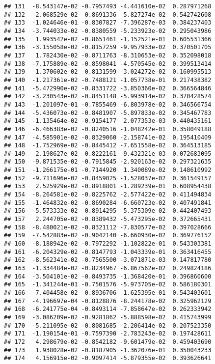 \documentclass[
]{article}
\begin{document}
\begin{verbatim}
## 131  -8.543147e-02 -0.7957493 -4.441610e-02  0.287971268
## 132  -2.068529e-02 -0.8691336 -5.827274e-02  0.542742608
## 133  -1.024646e-01 -0.8307827 -7.396287e-03  0.384237403
## 134  -3.744033e-02 -0.8380559 -5.233923e-02  0.295043986
## 135   1.993542e-02 -0.8651461 -1.152521e-01  0.605531366
## 136  -3.155058e-02 -0.8157259 -9.957933e-02  0.370501705
## 137   1.782430e-02 -0.8711763 -8.310653e-02  0.352098018
## 138  -7.175889e-02 -0.8598041 -4.570545e-02  0.399513414
## 139  -1.370602e-02 -0.8131599 -3.024272e-02  0.160995513
## 140  -1.217361e-02 -0.7488121 -1.057738e-01  0.217438382
## 141  -5.472990e-02 -0.8331722 -3.850360e-02  0.366564846
## 142  -3.230543e-02 -0.8451148 -5.993914e-02  0.370428574
## 143  -1.201097e-01 -0.7855469 -6.803978e-02  0.346566754
## 144  -5.436073e-02 -0.8481907 -5.897833e-02  0.345467783
## 145  -1.135464e-02 -0.9154177  2.077353e-03  0.440435161
## 146  -6.466383e-02 -0.8240516 -1.048242e-01  0.358049188
## 147  -4.585901e-02 -0.8329060 -2.158741e-02  0.195410409
## 148  -1.752969e-02 -0.8445412 -7.651558e-02  0.364513185
## 149  -2.198627e-02 -0.8222161 -9.432321e-03  0.072683095
## 150  -9.871535e-02 -0.7915845 -2.920163e-02  0.297321635
## 151  -1.266175e-01 -0.7144920  1.340089e-02  0.148610992
## 152  -9.711696e-02 -0.8459025 -1.528037e-02  0.361549157
## 153   2.525929e-02 -0.8918801 -1.289239e-01  0.608954438
## 154  -8.264581e-02 -0.8225762 -2.577422e-02  0.411494834
## 155  -1.464832e-02 -0.8690284 -6.660723e-02  0.407491841
## 156  -5.573333e-02 -0.8914295 -5.375309e-02  0.442407493
## 157   2.244705e-02 -0.8389432 -5.473295e-02  0.372665431
## 158  -8.480021e-02 -0.8321112 -7.830577e-02  0.397028666
## 159  -7.542883e-02 -0.9042140 -6.660930e-02  0.369776152
## 160  -8.188942e-02 -0.7972292 -1.102822e-01  0.543303381
## 161  -6.204329e-02 -0.8147793 -1.043339e-01  0.363416455
## 162  -8.562341e-02 -0.7565500 -3.071871e-03  0.147817780
## 163  -1.334484e-02 -0.8234967 -6.867562e-02  0.249824186
## 164  -3.504101e-02 -0.8493735 -1.368420e-01  0.396860600
## 165  -1.341244e-01 -0.7501576 -5.973705e-02  0.586180301
## 166   7.404458e-02 -0.8936706 -1.625395e-01  0.543403601
## 167  -4.196697e-04 -0.8128876 -8.244178e-02  0.325962129
## 168  -6.241775e-04 -0.8493114 -7.858647e-02  0.262333942
## 169  -3.086209e-02 -0.9281862 -5.888598e-02  0.415743999
## 170  -5.211095e-02 -0.8081685 -2.206414e-02  0.207523350
## 171  -1.190154e-01 -0.7597390 -2.783243e-02  0.197428611
## 172   4.298679e-02 -0.8542182 -9.601479e-02  0.459403690
## 173   1.938028e-02 -0.8187905 -1.362076e-01  0.350043233
## 174   4.156915e-02 -0.9097414 -5.879355e-02  0.393626641

\end{verbatim}
\end{document}
